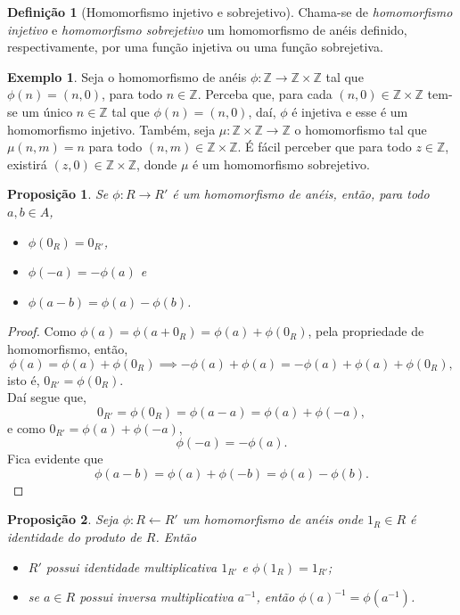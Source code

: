 \documentclass[a4paper,12pt]{report}
\theoremstyle{plain}
\newtheorem{proposicao}{Proposição}[section]
\theoremstyle{definition}
\newtheorem{definicao}{Definição}[section]
\newtheorem{exemplo}{Exemplo}[section]
\begin{document}
\begin{definicao}[Homomorfismo injetivo e sobrejetivo]
	Chama-se de \emph{homomorfismo injetivo} e \emph{homomorfismo sobrejetivo} um homomorfismo de anéis definido, respectivamente, por uma função injetiva ou uma função sobrejetiva.
\end{definicao}

\begin{exemplo}
	Seja o homomorfismo de anéis $\phi: \mathbb{Z} \longrightarrow \mathbb{Z}\times \mathbb{Z}$ tal que $\phi(n) = (n,0)$, para todo $n\in\mathbb{Z}$. Perceba que, para cada $(n,0)\in \mathbb{Z}\times \mathbb{Z}$ tem-se um único $n\in \mathbb{Z}$ tal que $\phi(n) = (n,0)$, daí, $\phi$ é injetiva e esse é um homomorfismo injetivo. Também, seja $\mu:\mathbb{Z}\times\mathbb{Z} \longrightarrow \mathbb{Z}$ o homomorfismo tal que $\mu(n,m) = n$ para todo $(n,m)\in \mathbb{Z}\times \mathbb{Z}$. É fácil perceber que para todo $z\in \mathbb{Z}$, existirá $(z,0)\in \mathbb{Z}\times \mathbb{Z}$, donde $\mu$ é um homomorfismo sobrejetivo.
\end{exemplo}

\begin{proposicao}
	Se $\phi: R \longrightarrow R'$ é um homomorfismo de anéis, então, para todo $a,b\in A$,
	\begin{itemize}
		\item $\phi(0_R) = 0_{R'}$,
		\item $\phi(-a) = -\phi(a)$ e
		\item $\phi(a-b) = \phi(a) - \phi(b)$.
	\end{itemize} 	
\end{proposicao}
\begin{proof}
	Como $\phi(a) = \phi(a+0_R) = \phi(a)+\phi(0_R)$, pela propriedade de homomorfismo, então, $$\phi(a) = \phi(a)+\phi(0_R) \implies -\phi(a)+\phi(a) = -\phi(a)+\phi(a)+\phi(0_R),$$ isto é, $0_{R'} = \phi(0_R)$.
	\\
	
	\noindent Daí segue que, $$0_{R'} = \phi(0_R) = \phi(a - a) = \phi(a) + \phi(-a),$$
	e como $0_{R'} = \phi(a) + \phi(-a)$, $$\phi(-a) = -\phi(a).$$
	\noindent Fica evidente que $$\phi(a-b) = \phi(a) + \phi(-b) = \phi(a) - \phi(b).$$
\end{proof}

\begin{proposicao}
	Seja $\phi:R \longleftarrow	R'$ um homomorfismo de anéis onde $1_R \in R$ é identidade do produto de $R$. Então
	\begin{itemize}
		\item $R'$ possui identidade multiplicativa $1_{R'}$ e $\phi(1_R) = 1_{R'}$;
		\item se $a\in R$ possui inversa multiplicativa $a^{-1}$, então $\phi(a)^{-1} = \phi(a^{-1})$.
	\end{itemize}	
\end{proposicao}
\end{document}
